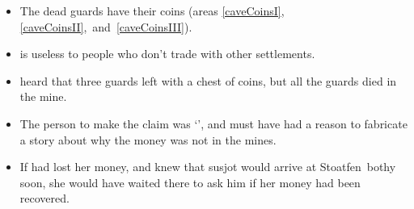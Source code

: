 \begin{multicols}{2}
\begin{itemize}
  \item
  The dead \glspl{guard} have their \glspl{coin} (\glspl{area} \ref{caveCoinsI}, \ref{caveCoinsII},~and~\ref{caveCoinsIII}).
  \item
   is useless to people who don't trade with other settlements.
  \item
   heard that three \glspl{guard} left with a chest of \glspl{coin}, but all the \glspl{guard} died in the mine.
  \item
  The person to make the claim was `', and must have had a reason to fabricate a story about why the money was not in the mines.
  \item
  If  had lost her money, and knew that \gls{susjot} would arrive at Stoatfen~\Gls{bothy} soon, she would have waited there to ask him if her money had been recovered.
\end{itemize}

\end{multicols}
